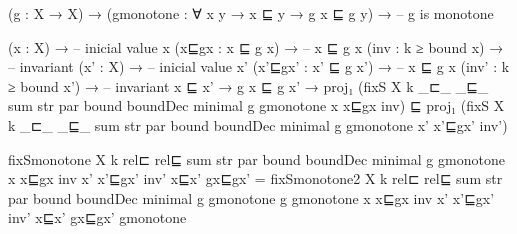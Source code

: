        (g : X → X) → 
       (gmonotone : ∀ {x y} → x ⊑ y → g x ⊑ g y) → -- g is monotone

       (x : X) →                 -- inicial value x   
       (x⊑gx : x ⊑ g x) →        -- x ⊑ g x 
       (inv : k ≥ bound x) →     -- invariant
       (x' : X) →                -- inicial value x'   
       (x'⊑gx' : x' ⊑ g x') →    -- x ⊑ g x 
       (inv' : k ≥ bound x') →    -- invariant
       x ⊑ x' → g x ⊑ g x' →   
       proj₁ (fixS X k _⊏_ _⊑_ sum str par bound boundDec minimal g gmonotone x x⊑gx inv) ⊑
       proj₁ (fixS X k _⊏_ _⊑_ sum str par bound boundDec minimal g gmonotone x' x'⊑gx' inv')

fixSmonotone X k rel⊏  rel⊑ sum str par bound boundDec minimal g gmonotone x 
         x⊑gx inv x' x'⊑gx' inv' x⊑x' gx⊑gx' =
      fixSmonotone2 X k rel⊏ rel⊑ sum str par bound boundDec
                    minimal g gmonotone g gmonotone x x⊑gx inv x' x'⊑gx' inv' x⊑x'
                    gx⊑gx' gmonotone 

